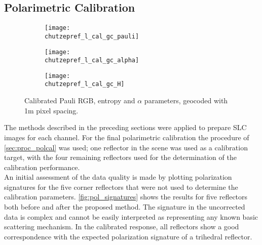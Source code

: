 \subsection{Polarimetric Calibration}\label{sec:res_polcal}
\begin{figure*}[ht]
	\begin{subfigure}[t]{2\columnwidth}
		\texttt{[image: \\chutzepref\_l\_cal\_gc\_pauli]}
		\label{fig:gc:pauli_rgb}
	\end{subfigure}
	\begin{subfigure}[t]{\columnwidth}
		\texttt{[image: \\chutzepref\_l\_cal\_gc\_alpha]}
		\label{fig:gc:alpha}
	\end{subfigure}
	\begin{subfigure}[t]{\columnwidth}
		\texttt{[image: \\chutzepref\_l\_cal\_gc\_H]}
		\label{fig:gc:alpha}
	\end{subfigure}
	\caption{Calibrated Pauli RGB, entropy and $\alpha$ parameters, geocoded with 1m pixel spacing.}
	\label{fig:gc}
\end{figure*}
The methods described in the preceding sections were applied to prepare SLC images for each channel. For the final polarimetric calibration the procedure of \autoref{sec:proc_polcal} was used; one reflector in the scene was used as a calibration target, with the four remaining reflectors used for the determination of the calibration performance.\\
An initial assessment of the data quality is made by plotting polarization signatures\cite{VanZyl1987} for the  five corner reflectors that were not used to determine the calibration parameters. \autoref{fig:pol_signatures} shows the results for five reflectors both before and after the proposed method.
The signature in the uncorrected data is complex and cannot be easily interpreted as representing any known basic scattering mechanism. In the calibrated response, all reflectors show a good correspondence with the expected polarization signature of a trihedral reflector.\\
